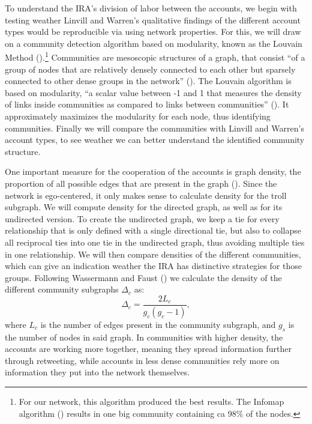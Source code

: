 \documentclass[12pt, titlepage=true, toc=bib]{scrartcl}
\begin{document}
To understand the IRA's division of labor between the accounts, we begin with testing weather Linvill and Warren's qualitative findings of the different account types would be reproducible via using network properties. For this, we will draw on a community detection algorithm based on modularity, known as the Louvain Method (\cite{blondel_fast_2008}).\footnote{For our network, this algorithm produced the best results. The Infomap algorithm (\cite[cf.][]{rosvall_maps_2008}) results in one big community containing ca 98\% of the nodes.} Communities are mesoscopic structures of a graph, that consist ``of a group of nodes that are relatively densely connected to each other but sparsely connected to other dense groups in the network'' (\cite[1083]{porter_communities_2009}). The Louvain algorithm is based on modularity, ``a scalar value between -1 and 1 that measures the density of links inside communities as compared to links between communities'' (\cites[2]{blondel_fast_2008}[cf. also][1089]{porter_communities_2009}). It approximately maximizes the modularity for each node, thus identifying communities. Finally we will compare the communities with Linvill and Warren's account types, to see weather we can better understand the identified community structure.

One important measure for the cooperation of the accounts is graph density, the proportion of all possible edges that are present in the graph (\cite[101]{wasserman_social_1994}). Since the network is ego-centered, it only makes sense to calculate density for the troll subgraph. We will compute density for the directed graph, as well as for its undirected version. To create the undirected graph, we keep a tie for every relationship that is only defined with a single directional tie, but also to collapse all reciprocal ties into one tie in the undirected graph, thus avoiding multiple ties in one relationship. We will then compare densities of the different communities, which can give an indication weather the IRA has distinctive strategies for those groups. Following Wassermann and Faust (\cite*[102]{wasserman_social_1994}) we calculate the density of the different community subgraphs \( \Delta_{c} \) as: \[ \Delta_{c} = \frac{2L_{c}}{g_{c}(g_{c} - 1)} ,\] where \( L_{c} \) is the number of edges present in the community subgraph, and \( g_{s} \) is the number of nodes in said graph. In communities with higher density, the accounts are working more together, meaning they spread information further through retweeting, while accounts in less dense communities rely more on information they put into the network themselves.
\end{document}
